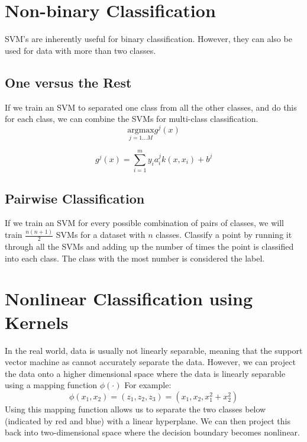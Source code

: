 \documentclass{article}
\begin{document}
\section{Non-binary Classification}

SVM's are inherently useful for binary classification. However, they can also be used for data with more than two classes.

\subsection{One versus the Rest}
If we train an SVM to separated one class from all the other classes, and do this for each class, we can combine the SVMs for multi-class classification.
$$\mbox{argmax}\limits_{j=1 \dots M} g^j(x)$$

\[g^j(x) = \sum_{i=1}^{m}y_i a_{i}^j k(x, x_i) + b^j\]

\subsection{Pairwise Classification}
If we train an SVM for every possible combination of pairs of classes, we will train $\frac{n(n+1)}{2}$ SVMs for a dataset with $n$ classes. Classify a point by running it through all the SVMs and adding up the number of times the point is classified into each class. The class with the most number is considered the label.


\section{Nonlinear Classification using Kernels}
In the real world, data is usually not linearly separable, meaning that the support vector machine as cannot accurately separate the data. However, we can project the data onto a higher dimensional space where the data is linearly separable using a mapping function $\phi{(\cdot)}$ For example:
\[ \phi{(x_1, x_2)} = (z_1, z_2, z_3) = (x_1, x_2, x_1^2 + x_2^2) \]
Using this mapping function allows us to separate the two classes below (indicated by red and blue) with a linear hyperplane. We can then project this back into two-dimensional space where the decision boundary becomes nonlinear.
\end{document}
